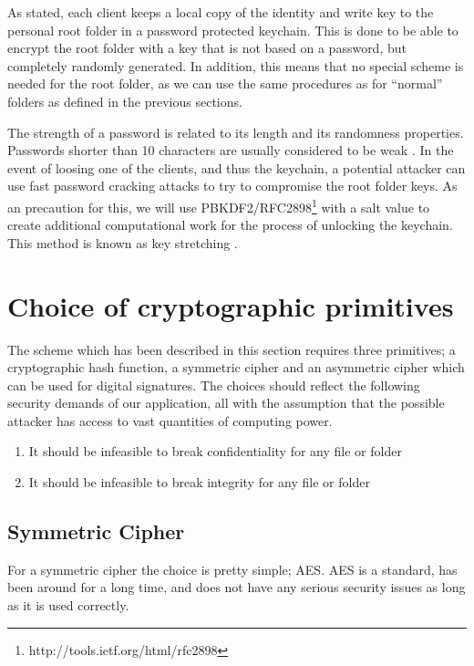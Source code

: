 \documentclass[pdftex,english,10pt,b5paper,twoside]{book}
\begin{document}
As stated, each client keeps a local copy of the identity and write key to the
personal root folder in a password protected keychain. This is done to be able
to encrypt the root folder with a key that is not based on a password, but
completely randomly generated. In addition, this means that no special scheme is
needed for the root folder, as we can use the same procedures as for ``normal''
folders as defined in the previous sections.

The strength of a password is related to its length and its randomness
properties. Passwords shorter than 10 characters are usually considered to be
weak \cite{pbkdf_nist}. In the event of loosing one of the clients, and thus the
keychain, a potential attacker can use fast password cracking attacks to try to
compromise the root folder keys. As an precaution for this, we will use
\ac{PBKDF2}/RFC2898\footnote{http://tools.ietf.org/html/rfc2898} with a salt
value to create additional computational work for the process of unlocking the
keychain. This method is known as key stretching \cite{keystretch}.



\section{Choice of cryptographic primitives}
The scheme which has been described in this section requires three primitives;
a cryptographic hash function, a symmetric cipher and an asymmetric cipher
which can be used for digital signatures. The choices should reflect the
following security demands of our application, all with the assumption that the
possible attacker has access to vast quantities of computing power.

\begin{enumerate}
    \item It should be infeasible to break confidentiality for any file or folder
    \item It should be infeasible to break integrity for any file or folder
\end{enumerate}

\subsection{Symmetric Cipher}
For a symmetric cipher the choice is pretty simple; \ac{AES}. \ac{AES} is
a standard, has been around for a long time, and does not have any serious
security issues as long as it is used correctly.
\end{document}
